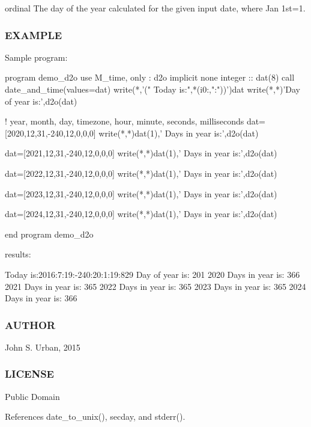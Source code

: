 ordinal The day of the year calculated for the given input date, where Jan 1st=1.

\subsubsection*{E\+X\+A\+M\+P\+LE}

\begin{DoxyVerb}Sample program:

 program demo_d2o
 use M_time, only : d2o
 implicit none
 integer :: dat(8)
    call date_and_time(values=dat)
    write(*,'(" Today is:",*(i0:,":"))')dat
    write(*,*)'Day of year is:',d2o(dat)

    ! year, month, day, timezone, hour, minute, seconds, milliseconds
    dat=[2020,12,31,-240,12,0,0,0]
    write(*,*)dat(1),' Days in year is:',d2o(dat)

    dat=[2021,12,31,-240,12,0,0,0]
    write(*,*)dat(1),' Days in year is:',d2o(dat)

    dat=[2022,12,31,-240,12,0,0,0]
    write(*,*)dat(1),' Days in year is:',d2o(dat)

    dat=[2023,12,31,-240,12,0,0,0]
    write(*,*)dat(1),' Days in year is:',d2o(dat)

    dat=[2024,12,31,-240,12,0,0,0]
    write(*,*)dat(1),' Days in year is:',d2o(dat)

 end program demo_d2o

results:

 Today is:2016:7:19:-240:20:1:19:829
 Day of year is:         201
        2020  Days in year is:         366
        2021  Days in year is:         365
        2022  Days in year is:         365
        2023  Days in year is:         365
        2024  Days in year is:         366
\end{DoxyVerb}


\subsubsection*{A\+U\+T\+H\+OR}

John S. Urban, 2015 \subsubsection*{L\+I\+C\+E\+N\+SE}

Public Domain 

References date\+\_\+to\+\_\+unix(), secday, and stderr().

